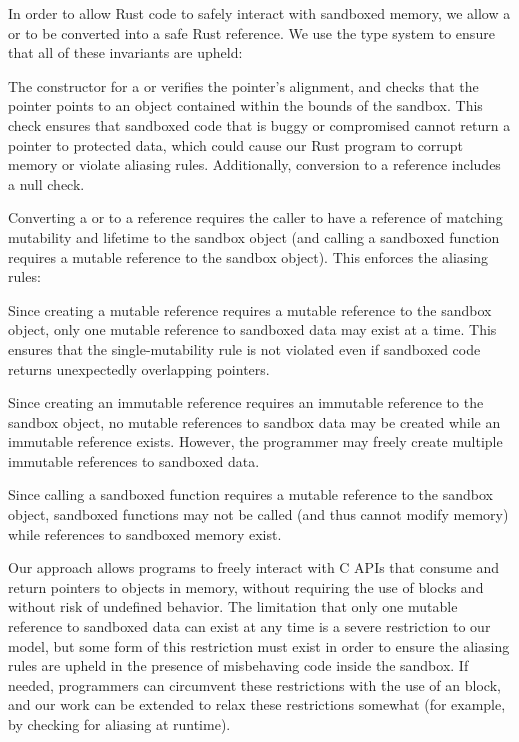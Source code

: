 In order to allow Rust code to safely interact with sandboxed memory, we allow a 
or  to be converted into a safe Rust reference. We use the type system to ensure
that all of these invariants are upheld:

\squishlist
    \item The constructor for a  or  verifies the pointer's
        alignment, and checks that the pointer points to an object contained within the bounds of
        the sandbox. This check ensures that sandboxed code that is buggy or compromised cannot
        return a pointer to protected data, which could cause our Rust program to corrupt memory or
        violate aliasing rules. Additionally, conversion to a reference includes a null check.
    \item Converting a  or  to a reference requires the caller
        to have a reference of matching mutability and lifetime to the sandbox object (and calling a
        sandboxed function requires a mutable reference to the sandbox object). This enforces the
        aliasing rules:
    \squishlist
        \item Since creating a mutable reference requires a mutable reference to the sandbox object,
            only one mutable reference to sandboxed data may exist at a time. This ensures that the
            single-mutability rule is not violated even if sandboxed code returns unexpectedly
            overlapping pointers.
        \item Since creating an immutable reference requires an immutable reference to the sandbox
            object, no mutable references to sandbox data may be created  while an immutable
            reference exists. However, the programmer may freely create multiple immutable
            references to sandboxed data.
        \item Since calling a sandboxed function requires a mutable reference to the sandbox object,
            sandboxed functions may not be called (and thus cannot modify memory) while references
            to sandboxed memory exist.
    \squishend
\squishend

Our approach allows programs to freely interact with C APIs that consume and return pointers to
objects in memory, without requiring the use of  blocks and without risk of undefined
behavior. The limitation that only one mutable reference to sandboxed data can exist at any time is
a severe restriction to our model, but some form of this restriction must exist in order to ensure
the aliasing rules are upheld in the presence of misbehaving code inside the sandbox. If needed,
programmers can circumvent these restrictions with the use of an  block, and our work
can be extended to relax these restrictions somewhat (for example, by checking for aliasing at
runtime).
